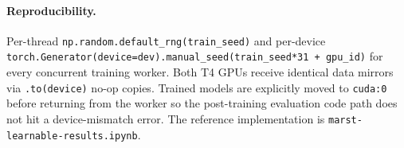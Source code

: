 \documentclass[11pt]{article}
\begin{document}
\paragraph{Reproducibility.}  Per-thread
\texttt{np.random.default\_rng(train\_seed)} and per-device
\texttt{torch.Generator(device=dev).manual\_seed(train\_seed*31 +
gpu\_id)} for every concurrent training worker.  Both T4 GPUs receive
identical data mirrors via \texttt{.to(device)} no-op copies.  Trained
models are explicitly moved to \texttt{cuda:0} before returning from
the worker so the post-training evaluation code path does not hit a
device-mismatch error.  The reference implementation is
\texttt{marst-learnable-results.ipynb}.


\end{document}
